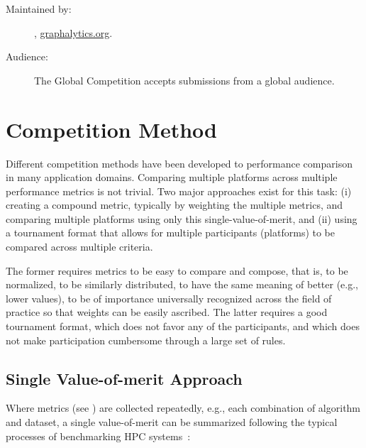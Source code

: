 \begin{description}
    \item[Maintained by:] \toolname, \url{graphalytics.org}.
    \item[Audience:] The Global \toolname{} Competition accepts submissions from a global audience.
\end{description} 











\section{Competition Method} \label{sec:competitions}
Different competition methods have been developed to performance comparison in many application domains. Comparing multiple platforms across multiple performance metrics is not trivial. Two major approaches exist for this task: (i) creating a compound metric, typically by weighting the multiple metrics, and comparing multiple platforms using only this single-value-of-merit, and (ii) using a tournament format that allows for multiple participants (platforms) to be compared across multiple criteria. 

The former requires metrics to be easy to compare and compose, that is, to be normalized, to be similarly distributed, to have the same meaning of better (e.g., lower values), to be of importance universally recognized across the field of practice so that weights can be easily ascribed. The latter requires a good tournament format, which does not favor any of the participants, and which does not make participation cumbersome through a large set of rules.


\subsection{Single Value-of-merit Approach} \label{sec:competitions:single_value}
Where metrics (see ) are collected repeatedly, e.g., each combination of algorithm and dataset, a single value-of-merit can be summarized following the typical processes of benchmarking HPC systems~\cite{DBLP:conf/sc/HoeflerB15}:

